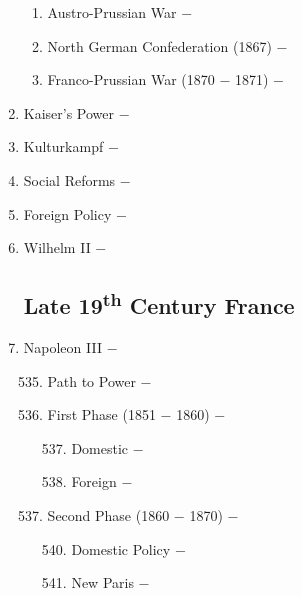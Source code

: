 \documentclass[12pt]{article}
\begin{document}
\begin{enumerate}
\begin{enumerate}[label=\arabic{*}.]
\item Austro-Prussian War $-$ 

\item North German Confederation (1867) $-$ 

\item Franco-Prussian War (1870 $-$ 1871) $-$ 

\end{enumerate}
\setcounter{enumi}{528}


\item Kaiser's Power $-$ 

\item Kulturkampf $-$ 

\item Social Reforms $-$ 

\item Foreign Policy $-$ 

\item Wilhelm II $-$ 

\subsection{Late 19\textsuperscript{th} Century France}

\item Napoleon III $-$ 
\begin{enumerate}[label=\arabic{*}.]
\setcounter{enumii}{534}

\item Path to Power $-$ 

\item First Phase (1851 $-$ 1860) $-$ 

\begin{enumerate}[label=\arabic{*}.]
\setcounter{enumiii}{536}

\item Domestic $-$ 

\item Foreign $-$ 

\end{enumerate}
\setcounter{enumii}{538}

\item Second Phase (1860 $-$ 1870) $-$

\begin{enumerate}[label=\arabic{*}.]
\setcounter{enumiii}{539}

\item Domestic Policy $-$ 

\item New Paris $-$ 


\end{enumerate}
\end{enumerate}
\end{enumerate}
\end{document}
